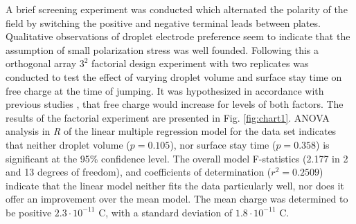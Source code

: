 \documentclass[10pt,a4paper]{article}
\begin{document}
A brief screening experiment was conducted which alternated the polarity of the field by switching the positive and negative terminal leads between plates. Qualitative observations of droplet electrode preference seem to indicate that the assumption of small polarization stress was well founded. Following this a orthogonal array $3^2$ factorial design experiment with two replicates was conducted to test the effect of varying droplet volume and surface stay time on free charge at the time of jumping. It was hypothesized in accordance with previous studies \cite{Choi:2013dg}, that free charge would increase for levels of both factors. The results of the factorial experiment are presented in Fig. \ref{fig:chart1}. ANOVA analysis in \emph{R} of the linear multiple regression model for the data set indicates that neither droplet volume ($p=0.105$), nor surface stay time ($p=0.358$) is significant at the 95\% confidence level. The overall model F-statistics (2.177 in 2 and 13 degrees of freedom), and coefficients of determination ($r^2 = 0.2509$) indicate that the linear model neither fits the data particularly well, nor does it offer an improvement over the mean model. The mean charge was determined to be positive $2.3 \cdot 10^{-11}$ C, with a standard deviation of $1.8 \cdot 10^{-11}$ C.
\end{document}
